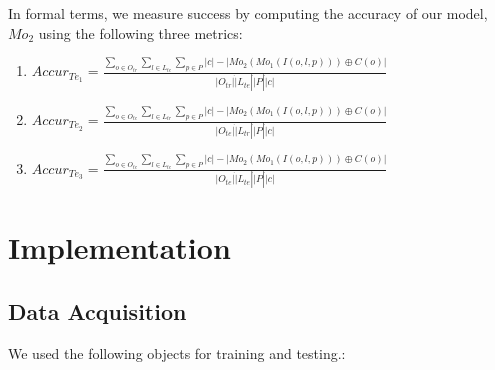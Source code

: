 \documentclass{article}
\begin{document}
In formal terms, we measure success by computing the accuracy of our model, $ Mo_2 $ using the following three metrics:

\begin{enumerate}
	\item $ Accur_{Te_{1}} = \frac {\sum_{o \in O_{tr}} \sum_{l \in L_{te}} \sum_{p \in P} |c| - | Mo_2(Mo_1(I(o, l, p))) \oplus C(o) |} {|O_{tr}| \dot |L_{te}| \dot |P| \dot |c| } $
	\item $ Accur_{Te_{2}} = \frac {\sum_{o \in O_{te}} \sum_{l \in L_{tr}} \sum_{p \in P} |c| - | Mo_2(Mo_1(I(o, l, p))) \oplus C(o) |} {|O_{te}| \dot |L_{tr}| \dot |P| \dot |c| } $
	\item $ Accur_{Te_{3}} = \frac {\sum_{o \in O_{te}} \sum_{l \in L_{te}} \sum_{p \in P} |c| - | Mo_2(Mo_1(I(o, l, p))) \oplus C(o) |} {|O_{te}| \dot |L_{te}| \dot |P| \dot |c| } $
\end{enumerate}

\section{Implementation}

\subsection{Data Acquisition}

We used the following objects for training and testing.:
\end{document}
